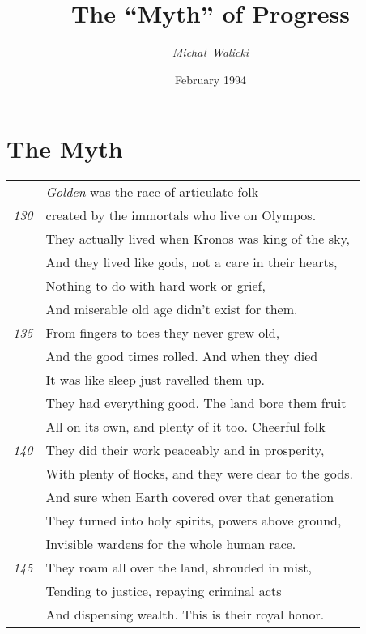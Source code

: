 %

\title{The ``Myth'' of Progress}
\author{{\em Micha{\l}\ Walicki}}
\date{February 1994}
\maketitle

\section{The Myth}
\hspace*{-3em}\scriptsize
\begin{tabular}[bht]{rl}
& {\em Golden} was the race of articulate folk \\
\tiny{\em 130}& created by the immortals who live on Olympos. \\
& They actually lived when Kronos was king of the sky, \\
& And they lived like gods, not a care in their hearts, \\
& Nothing to do with hard work or grief, \\
& And miserable old age didn't exist for them. \\
\tiny{\em 135} & From fingers to toes they never grew old, \\
& And the good times rolled. And when they died \\
& It was like sleep just ravelled them up. \\
& They had everything good. The land bore them fruit \\
& All on its own, and plenty of it too. Cheerful folk \\
\tiny{\em 140} & They did their work peaceably and in prosperity, \\
& With plenty of flocks, and they were dear to the gods. \\
& And sure when Earth covered over that generation \\
& They turned into holy spirits, powers above ground, \\
& Invisible wardens for the whole human race. \\
\tiny{\em 145}& They roam all over the land, shrouded in mist, \\
& Tending to justice, repaying criminal acts \\
& And dispensing wealth. This is their royal honor. \\[1ex]

\end{tabular}
